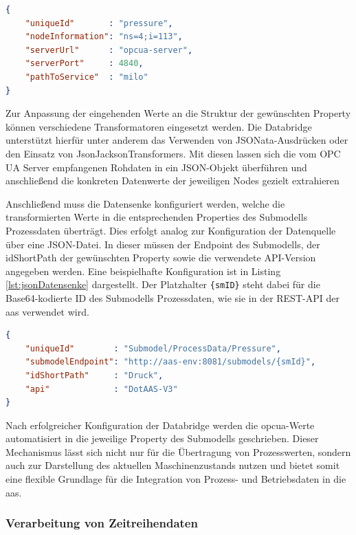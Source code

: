 \begin{lstlisting}[language=json, caption={Beispielhafte JSON-Konfiguration einer Datenquelle}, label={lst:jsonDatenquelle}]
{
    "uniqueId"       : "pressure",
    "nodeInformation": "ns=4;i=113",
    "serverUrl"      : "opcua-server",
    "serverPort"     : 4840,
    "pathToService"  : "milo"
}
\end{lstlisting}

Zur Anpassung der eingehenden Werte an die Struktur der gewünschten Property können verschiedene Transformatoren eingesetzt werden. 
Die Databridge unterstützt hierfür unter anderem das Verwenden von JSONata-Ausdrücken oder den Einsatz von JsonJacksonTransformers. 
Mit diesen lassen sich die vom OPC UA Server empfangenen Rohdaten in ein JSON-Objekt überführen und anschließend die konkreten Datenwerte der jeweiligen Nodes gezielt extrahieren

Anschließend muss die Datensenke konfiguriert werden, welche die transformierten Werte in die entsprechenden Properties des Submodells Prozessdaten überträgt.
Dies erfolgt analog zur Konfiguration der Datenquelle über eine JSON-Datei.
In dieser müssen der Endpoint des Submodells, der idShortPath der gewünschten Property sowie die verwendete API-Version angegeben werden.
Eine beispielhafte Konfiguration ist in Listing \ref{lst:jsonDatensenke} dargestellt.
Der Platzhalter \texttt{\{smID\}} steht dabei für die Base64-kodierte ID des Submodells Prozessdaten, wie sie in der REST-API der \acs{aas} verwendet wird.

\begin{lstlisting}[language=json, caption={Beispielhafte JSON-Konfiguration einer Datensenke}, label={lst:jsonDatensenke}]
{
    "uniqueId"        : "Submodel/ProcessData/Pressure",
    "submodelEndpoint": "http://aas-env:8081/submodels/{smId}",
    "idShortPath"     : "Druck",
    "api"             : "DotAAS-V3"
}
\end{lstlisting}

Nach erfolgreicher Konfiguration der Databridge werden die \acs{opcua}-Werte automatisiert in die jeweilige Property des Submodells geschrieben. 
Dieser Mechanismus lässt sich nicht nur für die Übertragung von Prozesswerten, sondern auch zur Darstellung des aktuellen Maschinenzustands nutzen und bietet somit eine flexible Grundlage für die Integration von Prozess- und Betriebsdaten in die \acs{aas}.

\subsubsection{Verarbeitung von Zeitreihendaten}

